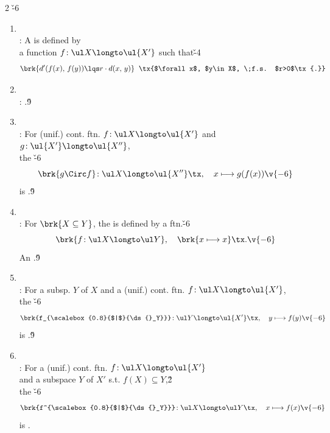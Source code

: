 \documentclass[dvipdfmx,a4paper,titlepage,9pt]{jsarticle}
\begin{document}
\begin{multicols*}{2}
\v{-6}
\begin{enumerate}[label=(\alph*)]
\item{}\\
: A  is defined by \\
\;\;a function $f\!:\ul X\longto\ul{X'}$ such that\v{-4}
$$\brk{d'(f(x),\,f(y))\lqs r\cdot d(x,\,y)}\;\;\tx{$\forall x$, $y\in X$, \;f.s. $r>0$\tx{.}}$$

\item{}\\
: .\v9

\item{}\\
: For (unif.) cont. ftn. $f\!:\ul X\longto\ul{X'}$ and $g\!:\ul{X'}\longto\ul{X''}$,\\
\;\;the \v{-6}
$$\brk{g\Circ f}\!:\ul X\longto\ul{X''}\tx,\quad x\longmapsto g(f(x))\v{-6}$$
\;\;is .\v9

\item{}\\
: For $\brk{X\subseteq Y}$, the  is defined by a ftn.\v{-6}
$$\brk{f\!:\ul X\longto\ul Y},\quad\brk{x\longmapsto x}\tx.\v{-6}$$
\;\;An .\v9

\item{}\\
: For a subsp. $Y$ of $X$ and a (unif.) cont. ftn. $f\!:\ul X\longto \ul{X'}$,\\
\;\;the \v{-6}
$$\brk{f_{\scalebox{0.8}{$|$}{\ds{}_Y}}}\!:\ul Y\longto\ul{X'}\tx,\quad y\longmapsto f(y)\v{-6}$$
\;\;is .\v9

\item{}\\
: For a (unif.) cont. ftn. $f\!:\ul X\longto\ul{X'}$\\
\;\;and a subspace $Y$ of $X'$ s.t. $f(X)\subseteq Y$,\v2\\
\;\;the \v{-6}
$$\brk{f^{\scalebox{0.8}{$|$}{\ds{}_Y}}}\!: \ul X\longto \ul Y\tx,\quad x\longmapsto f(x)\v{-6}$$
\;\;is .
\end{enumerate}


\end{multicols*}
\end{document}
